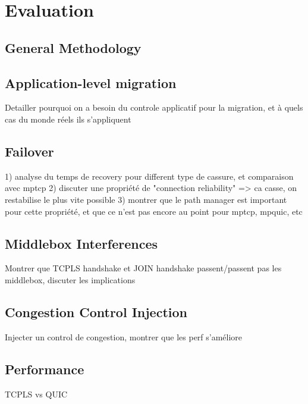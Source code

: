 \section{Evaluation}

\subsection{General Methodology}

\subsection{Application-level migration}

Detailler pourquoi on a besoin du controle applicatif pour la migration, et à
quels cas du monde réels ils s'appliquent

\subsection{Failover}

1) analyse du temps de recovery pour different type de cassure, et comparaison avec mptcp
2) discuter une propriété de "connection reliability" => ca casse, on restabilise le plus vite possible
3) montrer que le path manager est important pour cette propriété, et que ce n'est pas encore au point pour mptcp, mpquic, etc

\subsection{Middlebox Interferences}

Montrer que TCPLS handshake et JOIN handshake passent/passent pas les middlebox,
discuter les implications

\subsection{Congestion Control Injection}

Injecter un control de congestion, montrer que les perf s'améliore

\subsection{Performance}

TCPLS vs QUIC

